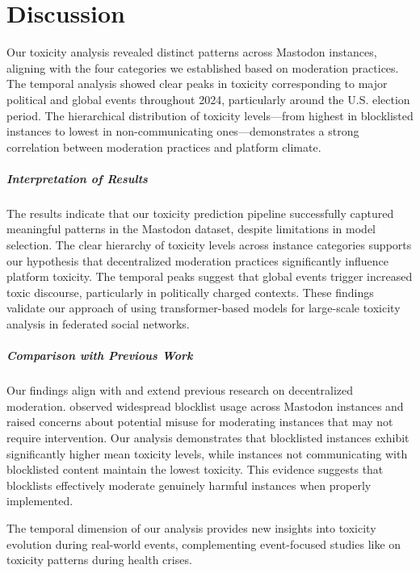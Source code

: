 \chapter{Discussion} \label{discussion}

Our toxicity analysis revealed distinct patterns across Mastodon instances, aligning with the four categories we established based on moderation practices. The temporal analysis showed clear peaks in toxicity corresponding to major political and global events throughout 2024, particularly around the U.S. election period. The hierarchical distribution of toxicity levels—from highest in blocklisted instances to lowest in non-communicating ones—demonstrates a strong correlation between moderation practices and platform climate.

\paragraph{Interpretation of Results}
The results indicate that our toxicity prediction pipeline successfully captured meaningful patterns in the Mastodon dataset, despite limitations in model selection. The clear hierarchy of toxicity levels across instance categories supports our hypothesis that decentralized moderation practices significantly influence platform toxicity. The temporal peaks suggest that global events trigger increased toxic discourse, particularly in politically charged contexts. These findings validate our approach of using transformer-based models for large-scale toxicity analysis in federated social networks.

\paragraph{Comparison with Previous Work}
Our findings align with and extend previous research on decentralized moderation. \citet{bono:2024} observed widespread blocklist usage across Mastodon instances and raised concerns about potential misuse for moderating instances that may not require intervention. Our analysis demonstrates that blocklisted instances exhibit significantly higher mean toxicity levels, while instances not communicating with blocklisted content maintain the lowest toxicity. This evidence suggests that blocklists effectively moderate genuinely harmful instances when properly implemented. 

The temporal dimension of our analysis provides new insights into toxicity evolution during real-world events, complementing event-focused studies like \citet{fan:2022} on toxicity patterns during health crises.


